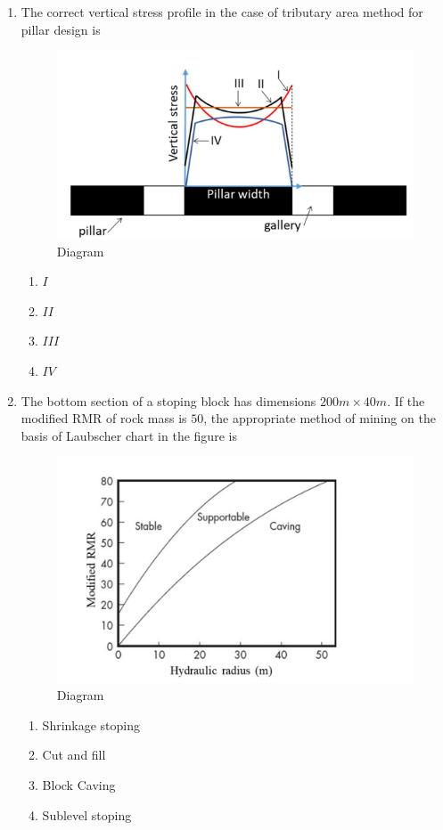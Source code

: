 \documentclass[journal,12pt,onecolumn]{IEEEtran}
\theoremstyle{remark}
\begin{document}
\begin{enumerate}
\hfill{}

\begin{multicols}{4}
\begin{enumerate}
\item $7$
\item $5$
\item $2$
\item $0$
\end{enumerate}
\end{multicols}
\item The correct vertical stress profile in the case of tributary area method for pillar
design is 
\begin{figure}[H]
\centering
\includegraphics[width=0.4\columnwidth]{figs/pillar.png}
\caption{Diagram}
\label{fig:p}
\end{figure}

\hfill{}
\begin{multicols}{4}
\begin{enumerate}
\item $I$
\item $II$
\item $III$
\item $IV$
\end{enumerate}
\end{multicols}
\item The bottom section of a stoping block has dimensions $200 m\times40 m$. If the modified RMR of rock mass is $50$, the appropriate method of mining on the basis of Laubscher chart in the figure is 
\begin{figure}[H]
\centering
\includegraphics[width=0.4\columnwidth]{figs/RMR.png}
\caption{Diagram}
\label{fig:RMR}
\end{figure}

\hfill{}
\begin{multicols}{4}
\begin{enumerate}
\item Shrinkage stoping
\item Cut and fill 
\item Block Caving
\item Sublevel stoping
\end{enumerate}
\end{multicols}


\end{enumerate}
\end{document}

